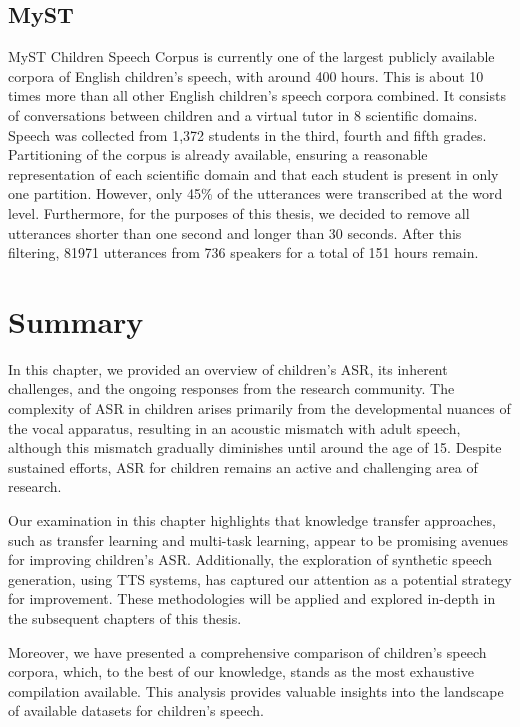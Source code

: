 \subsection{MyST}
\ac{MyST} Children Speech Corpus \cite{MyST} is currently one of the largest publicly available corpora of English children's speech, with around 400 hours. This is about 10 times more than all other English children's speech corpora combined. It consists of conversations between children and a virtual tutor in 8 scientific domains. Speech was collected from 1,372  students in the third, fourth and fifth grades. Partitioning of the corpus is already available, ensuring a reasonable representation of each scientific domain and that each student is present in only one partition. However, only 45\% of the utterances were transcribed at the word level. Furthermore, for the purposes of this thesis, we decided to remove all utterances shorter than one second and longer than 30 seconds. After this filtering, 81971 utterances from 736 speakers for a total of 151 hours remain.


\section{Summary}
In this chapter, we provided an overview of children's \ac{ASR}, its inherent challenges, and the ongoing responses from the research community. The complexity of \ac{ASR} in children arises primarily from the developmental nuances of the vocal apparatus, resulting in an acoustic mismatch with adult speech, although this mismatch gradually diminishes until around the age of 15. Despite sustained efforts, \ac{ASR} for children remains an active and challenging area of research.

Our examination in this chapter highlights that knowledge transfer approaches, such as transfer learning and multi-task learning, appear to be promising avenues for improving children's \ac{ASR}. Additionally, the exploration of synthetic speech generation, using \ac{TTS} systems, has captured our attention as a potential strategy for improvement. These methodologies will be applied and explored in-depth in the subsequent chapters of this thesis.

Moreover, we have presented a comprehensive comparison of children's speech corpora, which, to the best of our knowledge, stands as the most exhaustive compilation available. This analysis provides valuable insights into the landscape of available datasets for children's speech.
